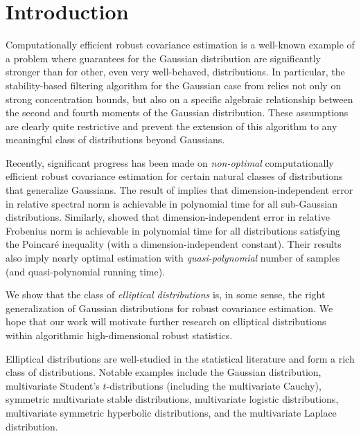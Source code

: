 \section{Introduction}
\label{sec:introduction}

Computationally efficient robust covariance estimation is a well-known example of a problem where guarantees for the Gaussian distribution are significantly stronger than for other, even very well-behaved, distributions. In particular, the stability-based filtering algorithm for the Gaussian case from \cite{DiakonikolasKK016} relies not only on strong concentration bounds, but also on a specific algebraic relationship between the second and fourth moments of the Gaussian distribution. These assumptions are clearly quite restrictive and prevent the extension of this algorithm to any meaningful class of distributions beyond Gaussians.

Recently, significant progress has been made on \emph{non-optimal} computationally efficient robust covariance estimation for certain natural classes of distributions that generalize Gaussians. The result of \cite{sos-subgaussian} implies that dimension-independent error in relative spectral norm is achievable in polynomial time for all sub-Gaussian distributions. Similarly, \cite{sos-poincare} showed that dimension-independent error in relative Frobenius norm is achievable in polynomial time for all distributions satisfying the Poincaré inequality (with a dimension-independent constant). Their results also imply nearly optimal estimation with \emph{quasi-polynomial} number of samples (and quasi-polynomial running time).

We show that the class of \emph{elliptical distributions} is, in some sense, the right generalization of Gaussian distributions for robust covariance estimation. We hope that our work will motivate further research on elliptical distributions within algorithmic high-dimensional robust statistics.

Elliptical distributions are well-studied in the statistical literature and form a rich class of distributions.
Notable examples include the Gaussian distribution, multivariate Student's $t$-distributions (including the multivariate Cauchy), symmetric multivariate stable distributions, multivariate logistic distributions, multivariate symmetric hyperbolic distributions, and the multivariate Laplace distribution.

